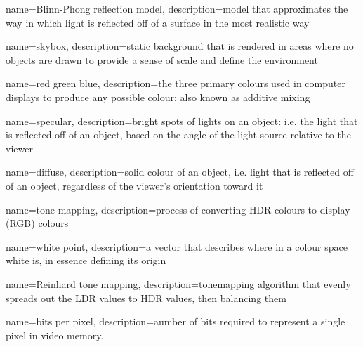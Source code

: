  {
  name=Blinn-Phong reflection model,
  description={model that approximates the way in which light is reflected off of a surface in the most realistic way}
}

 {
  name=skybox,
  description={static background that is rendered in areas where no objects are drawn to provide a sense of scale and define the environment}
}

 {
  name=red green blue,
  description={the three primary colours used in computer displays to produce any possible colour; also known as additive mixing}
}

 {
  name=specular,
  description={bright spots of lights on an object: i.e. the light that is reflected off of an object, based on the angle of the light source relative to the viewer}
}

 {
  name=diffuse,
  description={solid colour of an object, i.e. light that is reflected off of an object, regardless of the viewer's orientation toward it}
}

 {
  name=tone mapping,
  description={process of converting \gls{HDR} colours to display (\gls{RGB}) colours}
}

 {
  name=white point,
  description={a vector that describes where in a colour space white is, in essence defining its origin}
}

 {
  name=Reinhard tone mapping,
  description={\gls{tonemapping} algorithm that evenly spreads out the \gls{LDR} values to \gls{HDR} values, then balancing them}
}

 {
  name=bits per pixel,
  description={aumber of bits required to represent a single pixel in video memory.}
}